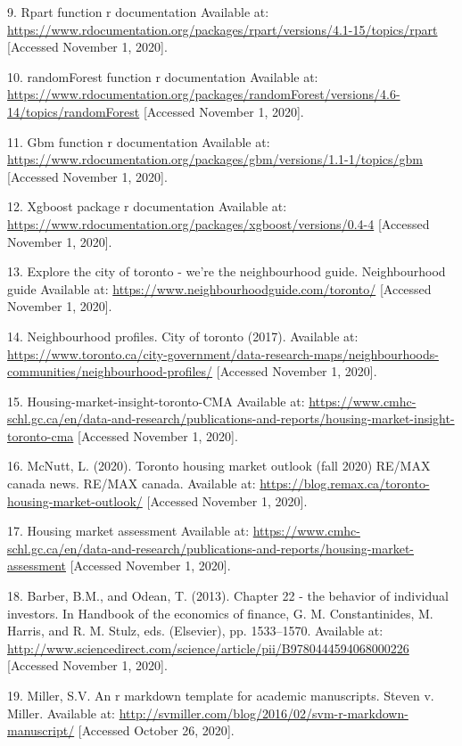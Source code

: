 \documentclass[11pt,]{article}
\begin{document}
\leavevmode\hypertarget{ref-noauthor_rpart_nodate}{}%
9. Rpart function r documentation Available at:
\url{https://www.rdocumentation.org/packages/rpart/versions/4.1-15/topics/rpart}
{[}Accessed November 1, 2020{]}.

\leavevmode\hypertarget{ref-noauthor_randomforest_nodate}{}%
10. randomForest function r documentation Available at:
\url{https://www.rdocumentation.org/packages/randomForest/versions/4.6-14/topics/randomForest}
{[}Accessed November 1, 2020{]}.

\leavevmode\hypertarget{ref-noauthor_gbm_nodate}{}%
11. Gbm function r documentation Available at:
\url{https://www.rdocumentation.org/packages/gbm/versions/1.1-1/topics/gbm}
{[}Accessed November 1, 2020{]}.

\leavevmode\hypertarget{ref-noauthor_xgboost_nodate}{}%
12. Xgboost package r documentation Available at:
\url{https://www.rdocumentation.org/packages/xgboost/versions/0.4-4}
{[}Accessed November 1, 2020{]}.

\leavevmode\hypertarget{ref-noauthor_explore_nodate}{}%
13. Explore the city of toronto - we're the neighbourhood guide.
Neighbourhood guide Available at:
\url{https://www.neighbourhoodguide.com/toronto/} {[}Accessed November
1, 2020{]}.

\leavevmode\hypertarget{ref-noauthor_neighbourhood_2017}{}%
14. Neighbourhood profiles. City of toronto (2017). Available at:
\url{https://www.toronto.ca/city-government/data-research-maps/neighbourhoods-communities/neighbourhood-profiles/}
{[}Accessed November 1, 2020{]}.

\leavevmode\hypertarget{ref-noauthor_housing-market-insight-toronto-cma_nodate}{}%
15. Housing-market-insight-toronto-CMA Available at:
\url{https://www.cmhc-schl.gc.ca/en/data-and-research/publications-and-reports/housing-market-insight-toronto-cma}
{[}Accessed November 1, 2020{]}.

\leavevmode\hypertarget{ref-mcnutt_toronto_2020}{}%
16. McNutt, L. (2020). Toronto housing market outlook (fall 2020) RE/MAX
canada news. RE/MAX canada. Available at:
\url{https://blog.remax.ca/toronto-housing-market-outlook/} {[}Accessed
November 1, 2020{]}.

\leavevmode\hypertarget{ref-noauthor_housing_nodate}{}%
17. Housing market assessment Available at:
\url{https://www.cmhc-schl.gc.ca/en/data-and-research/publications-and-reports/housing-market-assessment}
{[}Accessed November 1, 2020{]}.

\leavevmode\hypertarget{ref-barber_chapter_2013}{}%
18. Barber, B.M., and Odean, T. (2013). Chapter 22 - the behavior of
individual investors. In Handbook of the economics of finance, G. M.
Constantinides, M. Harris, and R. M. Stulz, eds. (Elsevier), pp.
1533--1570. Available at:
\url{http://www.sciencedirect.com/science/article/pii/B9780444594068000226}
{[}Accessed November 1, 2020{]}.

\leavevmode\hypertarget{ref-miller_r_nodate}{}%
19. Miller, S.V. An r markdown template for academic manuscripts. Steven
v. Miller. Available at:
\url{http://svmiller.com/blog/2016/02/svm-r-markdown-manuscript/}
{[}Accessed October 26, 2020{]}.





\newpage
\singlespacing 
\end{document}
